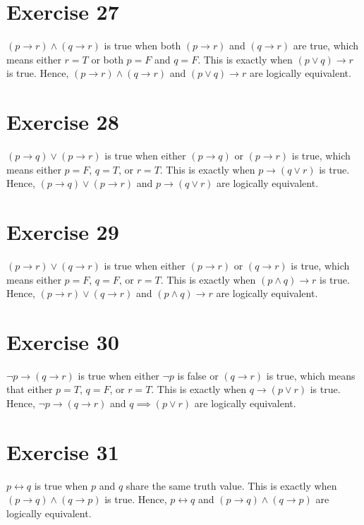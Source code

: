 \documentclass{article}
\let\biconditional\leftrightarrow
\let\conditional\rightarrow
\begin{document}
\pagebreak
\section{Exercise 27}
$(p \conditional r) \land (q \conditional r)$ is true when both $(p \conditional r)$ and $(q \conditional r)$ are true, which means either $r = T$ or both $p = F$ and $q = F$. This is exactly when $(p \lor q) \conditional r$ is true. Hence, $(p \conditional r) \land (q \conditional r)$ and $(p \lor q) \conditional r$ are logically equivalent.

\pagebreak
\section{Exercise 28}
$(p \conditional q) \lor (p \conditional r)$ is true when either $(p \conditional q)$ or $(p \conditional r)$ is true, which means either $p = F$, $q = T$, or $r = T$. This is exactly when $p \conditional (q \lor r)$ is true. Hence, $(p \conditional q) \lor (p \conditional r)$ and $p \conditional (q \lor r)$ are logically equivalent.

\pagebreak
\section{Exercise 29}
$(p \conditional r) \lor (q \conditional r)$ is true when either $(p \conditional r)$ or $(q \conditional r)$ is true, which means either $p = F$, $q = F$, or $r = T$. This is exactly when $(p \land q) \conditional r$ is true. Hence, $(p \conditional r) \lor (q \conditional r)$ and $(p \land q) \conditional r$ are logically equivalent.

\pagebreak
\section{Exercise 30}
$\neg p \conditional (q \conditional r)$ is true when either $\neg p$ is false or $(q \conditional r)$ is true, which means that either $p = T$, $q = F$, or $r = T$. This is exactly when $q \conditional (p \lor r)$ is true. Hence, $\neg p \conditional (q \conditional r)$ and $q \implies (p \lor r)$ are logically equivalent.

\pagebreak
\section{Exercise 31}
$p \biconditional q$ is true when $p$ and $q$ share the same truth value. This is exactly when $(p \conditional q) \land (q \conditional p)$ is true. Hence, $p \biconditional q$ and $(p \conditional q) \land (q \conditional p)$ are logically equivalent.
\end{document}
